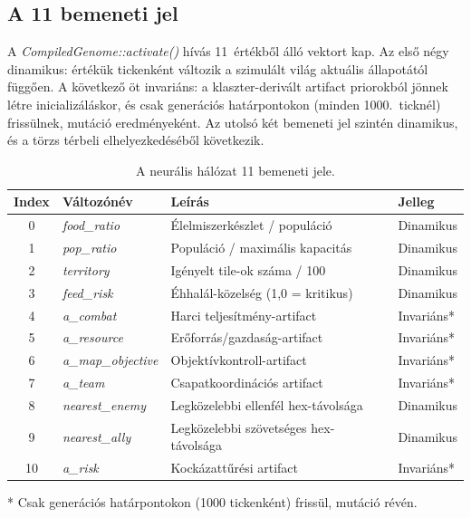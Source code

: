 \subsection*{A 11 bemeneti jel}

A \textit{CompiledGenome::activate()} hívás 11~értékből álló vektort kap.
Az első négy dinamikus: értékük tickenként változik a szimulált világ aktuális
állapotától függően. A következő öt invariáns: a klaszter-derivált artifact priorokból
jönnek létre inicializáláskor, és csak generációs határpontokon (minden 1000.~ticknél)
frissülnek, mutáció eredményeként. Az utolsó két bemeneti jel szintén dinamikus,
és a törzs térbeli elhelyezkedéséből következik.

\begin{table}[h]
  \centering
  \caption{A neurális hálózat 11 bemeneti jele.}
  \label{tab:neurosim-inputs}
  \begin{tabular}{clll}
    \hline
    \textbf{Index} & \textbf{Változónév} & \textbf{Leírás} & \textbf{Jelleg} \\
    \hline
    0 & \textit{food\_ratio}         & Élelmiszerkészlet / populáció         & Dinamikus \\
    1 & \textit{pop\_ratio}          & Populáció / maximális kapacitás        & Dinamikus \\
    2 & \textit{territory}           & Igényelt tile-ok száma / 100           & Dinamikus \\
    3 & \textit{feed\_risk}          & Éhhalál-közelség (1{,}0 = kritikus)   & Dinamikus \\
    4 & \textit{a\_combat}           & Harci teljesítmény-artifact             & Invariáns* \\
    5 & \textit{a\_resource}         & Erőforrás/gazdaság-artifact             & Invariáns* \\
    6 & \textit{a\_map\_objective}   & Objektívkontroll-artifact               & Invariáns* \\
    7 & \textit{a\_team}             & Csapatkoordinációs artifact             & Invariáns* \\
    8 & \textit{nearest\_enemy}      & Legközelebbi ellenfél hex-távolsága    & Dinamikus \\
    9 & \textit{nearest\_ally}       & Legközelebbi szövetséges hex-távolsága & Dinamikus \\
   10 & \textit{a\_risk}             & Kockázattűrési artifact                 & Invariáns* \\
    \hline
  \end{tabular}
  \begin{flushleft}
    \small{* Csak generációs határpontokon (1000 tickenként) frissül, mutáció révén.}
  \end{flushleft}
\end{table}

